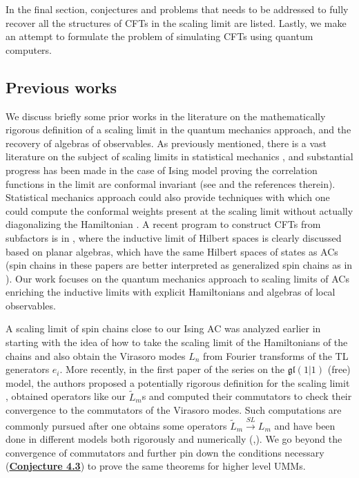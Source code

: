 \documentclass[twoside,11pt,titlepage]{amsart}
\renewcommand{\=}[1]{\stackrel{#1}{=}} %
\theoremstyle{definition}
\theoremstyle{remark}
\begin{document}
In the final section, conjectures and problems that needs to be addressed to fully recover all the structures of CFTs in the scaling limit are listed. Lastly, we make an attempt to formulate the problem of simulating CFTs using quantum computers. 

\subsection{Previous works}\label{1.6}

\hfill \break
We discuss briefly some prior works in the literature on the mathematically rigorous definition of a scaling limit in the quantum mechanics approach, and the recovery of algebras of observables. As previously mentioned, there is a vast literature on the subject of scaling limits in statistical mechanics \cite{baxter2016exactly}, and substantial progress has been made in the case of Ising model proving the correlation functions in the limit are conformal invariant (see \cite{smirnov07,chelkak2012conformal} and the references therein). Statistical mechanics approach could also provide techniques with which one could compute the conformal weights present at the scaling limit without actually diagonalizing the Hamiltonian \cite{aasen2016topological}. A recent program to construct CFTs from subfactors is in \cite{jones17, jones14, jones16}, where the inductive limit of Hilbert spaces is clearly discussed based on planar algebras, which have the same Hilbert spaces of states as ACs (spin chains in these papers are better interpreted as generalized spin chains as in \cite{jones03}). Our work focuses on the quantum mechanics approach to scaling limits of ACs enriching the inductive limits \cite{jones14} with explicit Hamiltonians and algebras of local observables.

A scaling limit of spin chains close to our Ising AC was analyzed earlier in \cite{koo1994representations} starting with the idea of how to take the scaling limit of the Hamiltonians of the chains and also obtain the Virasoro modes $L_n$ from Fourier transforms of the TL generators $e_i$. More recently, in the first paper of the series \cite{gainutdinov2013continuum,gainutdinov2013bimodule,gainutdinov2016associative} on the $\mathfrak{gl}(1|1)$ (free) model, the authors proposed a potentially rigorous definition for the scaling limit \cite[section 4.3]{gainutdinov2013continuum}, obtained operators like our $\widetilde{L}_m$s and computed their commutators to check their convergence to the commutators of the Virasoro modes. Such computations are commonly pursued after one obtains some operators $\widetilde{L}_m \xrightarrow{SL} L_m$ and have been done in different models both rigorously and numerically (\cite{gainutdinov2014lattice},\cite[p.19 and references therein]{gainutdinov2013logarithmic}). We go beyond the convergence of commutators and further pin down the conditions necessary (\hyperref[cnj4.3]{\textbf{Conjecture 4.3}}) to prove the same theorems for higher level UMMs. 
\end{document}
